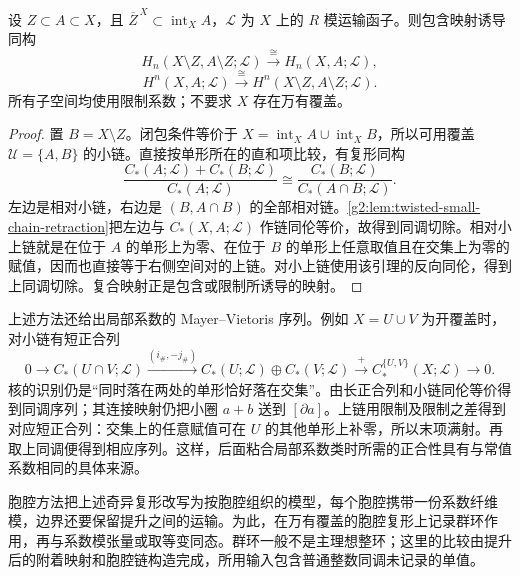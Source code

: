 \begin{theorem}\label{g2:thm:twisted-excision}
	设 \(Z\subset A\subset X\)，且 \(\overline Z^{\,X}\subset\operatorname{int}_X A\)，\(\mathcal L\) 为 \(X\) 上的 \(R\) 模运输函子。则包含映射诱导同构
	\[
		H_n(X\setminus Z,A\setminus Z;\mathcal L)\xrightarrow{\ \cong\ }H_n(X,A;\mathcal L),
	\]
	\[
		H^n(X,A;\mathcal L)\xrightarrow{\ \cong\ }H^n(X\setminus Z,A\setminus Z;\mathcal L).
	\]
	所有子空间均使用限制系数；不要求 \(X\) 存在万有覆盖。
\end{theorem}
\begin{proof}
	置 \(B=X\setminus Z\)。闭包条件等价于 \(X=\operatorname{int}_X A\cup\operatorname{int}_X B\)，所以可用覆盖 \(\mathcal U=\{A,B\}\) 的小链。直接按单形所在的直和项比较，有复形同构
	\[
		\frac{C_*(A;\mathcal L)+C_*(B;\mathcal L)}{C_*(A;\mathcal L)}
		\cong\frac{C_*(B;\mathcal L)}{C_*(A\cap B;\mathcal L)}.
	\]
	左边是相对小链，右边是 \((B,A\cap B)\) 的全部相对链。\cref{g2:lem:twisted-small-chain-retraction}把左边与 \(C_*(X,A;\mathcal L)\) 作链同伦等价，故得到同调切除。相对小上链就是在位于 \(A\) 的单形上为零、在位于 \(B\) 的单形上任意取值且在交集上为零的赋值，因而也直接等于右侧空间对的上链。对小上链使用该引理的反向同伦，得到上同调切除。复合映射正是包含或限制所诱导的映射。
\end{proof}

上述方法还给出局部系数的 Mayer--Vietoris 序列。例如 \(X=U\cup V\) 为开覆盖时，对小链有短正合列
\[
	0\longrightarrow C_*(U\cap V;\mathcal L)
	\xrightarrow{(i_\#,-j_\#)}C_*(U;\mathcal L)\oplus C_*(V;\mathcal L)
	\xrightarrow{+}C_*^{\{U,V\}}(X;\mathcal L)\longrightarrow0.
\]
核的识别仍是“同时落在两处的单形恰好落在交集”。由长正合列和小链同伦等价得到同调序列；其连接映射仍把小圈 \(a+b\) 送到 \([\partial a]\)。上链用限制及限制之差得到对应短正合列：交集上的任意赋值可在 \(U\) 的其他单形上补零，所以末项满射。再取上同调便得到相应序列。这样，后面粘合局部系数类时所需的正合性具有与常值系数相同的具体来源。

\ProseParagraphBreak

胞腔方法把上述奇异复形改写为按胞腔组织的模型，每个胞腔携带一份系数纤维模，边界还要保留提升之间的运输。为此，在万有覆盖的胞腔复形上记录群环作用，再与系数模张量或取等变同态。群环一般不是主理想整环；这里的比较由提升后的附着映射和胞腔链构造完成，所用输入包含普通整数同调未记录的单值。

